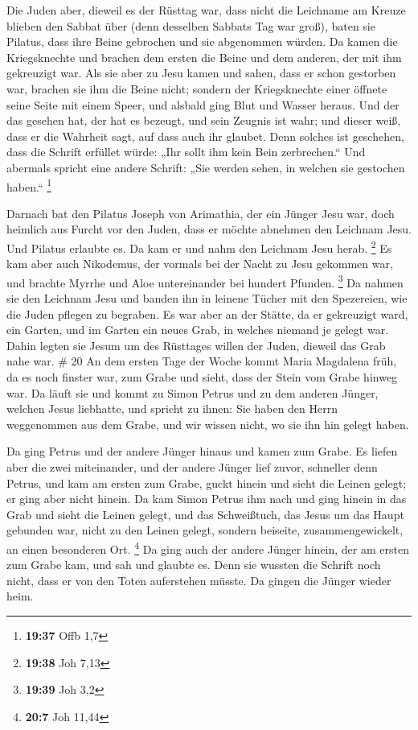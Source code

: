  Die Juden aber, dieweil es der Rüsttag war, dass nicht
die Leichname am Kreuze blieben den Sabbat über (denn desselben Sabbats
Tag war groß), baten sie Pilatus, dass ihre Beine gebrochen und sie
abgenommen würden.  Da kamen die Kriegsknechte und
brachen dem ersten die Beine und dem anderen, der mit ihm gekreuzigt
war.  Als sie aber zu Jesu kamen und sahen, dass er schon
gestorben war, brachen sie ihm die Beine nicht;  sondern
der Kriegsknechte einer öffnete seine Seite mit einem Speer, und alsbald
ging Blut und Wasser heraus.  Und der das gesehen hat,
der hat es bezeugt, und sein Zeugnis ist wahr; und dieser weiß, dass er
die Wahrheit sagt, auf dass auch ihr glaubet.  Denn
solches ist geschehen, dass die Schrift erfüllet würde: „Ihr sollt ihm
kein Bein zerbrechen.``  Und abermals spricht eine andere
Schrift: „Sie werden sehen, in welchen sie gestochen haben.``
\footnote{\textbf{19:37} Offb 1,7}

 Darnach bat den Pilatus Joseph von Arimathia, der ein
Jünger Jesu war, doch heimlich aus Furcht vor den Juden, dass er möchte
abnehmen den Leichnam Jesu. Und Pilatus erlaubte es. Da kam er und nahm
den Leichnam Jesu herab. \footnote{\textbf{19:38} Joh 7,13}
 Es kam aber auch Nikodemus, der vormals bei der Nacht zu
Jesu gekommen war, und brachte Myrrhe und Aloe untereinander bei hundert
Pfunden. \footnote{\textbf{19:39} Joh 3,2}  Da nahmen sie
den Leichnam Jesu und banden ihn in leinene Tücher mit den Spezereien,
wie die Juden pflegen zu begraben.  Es war aber an der
Stätte, da er gekreuzigt ward, ein Garten, und im Garten ein neues Grab,
in welches niemand je gelegt war.  Dahin legten sie Jesum
um des Rüsttages willen der Juden, dieweil das Grab nahe war. \# 20
 An dem ersten Tage der Woche kommt Maria Magdalena früh,
da es noch finster war, zum Grabe und sieht, dass der Stein vom Grabe
hinweg war.  Da läuft sie und kommt zu Simon Petrus und zu
dem anderen Jünger, welchen Jesus liebhatte, und spricht zu ihnen: Sie
haben den Herrn weggenommen aus dem Grabe, und wir wissen nicht, wo sie
ihn hin gelegt haben.

 Da ging Petrus und der andere Jünger hinaus und kamen zum
Grabe.  Es liefen aber die zwei miteinander, und der
andere Jünger lief zuvor, schneller denn Petrus, und kam am ersten zum
Grabe,  guckt hinein und sieht die Leinen gelegt; er ging
aber nicht hinein.  Da kam Simon Petrus ihm nach und ging
hinein in das Grab und sieht die Leinen gelegt,  und das
Schweißtuch, das Jesus um das Haupt gebunden war, nicht zu den Leinen
gelegt, sondern beiseite, zusammengewickelt, an einen besonderen Ort.
\footnote{\textbf{20:7} Joh 11,44}  Da ging auch der
andere Jünger hinein, der am ersten zum Grabe kam, und sah und glaubte
es.  Denn sie wussten die Schrift noch nicht, dass er von
den Toten auferstehen müsste.  Da gingen die Jünger
wieder heim.

